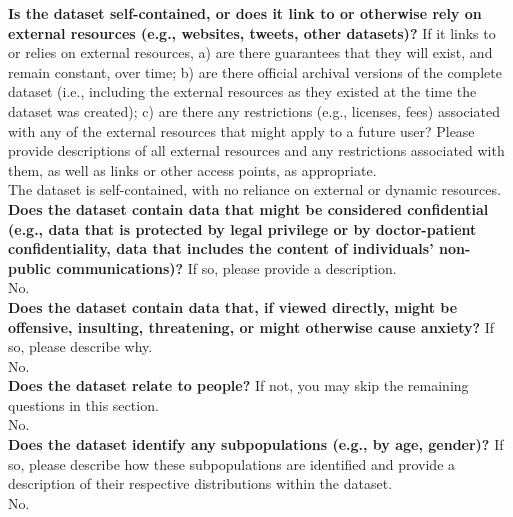     \textcolor{\sectioncolor}{\textbf{Is the dataset self-contained, or does it link to or otherwise rely on
    external resources (e.g., websites, tweets, other datasets)?
    }
    If it links to or relies on external resources, a) are there guarantees
    that they will exist, and remain constant, over time; b) are there official
    archival versions of the complete dataset (i.e., including the external
    resources as they existed at the time the dataset was created); c) are
    there any restrictions (e.g., licenses, fees) associated with any of the
    external resources that might apply to a future user? Please provide
    descriptions of all external resources and any restrictions associated with
    them, as well as links or other access points, as appropriate.
    } \\
    The dataset is self-contained, with no reliance on external or dynamic resources. \\
    
    \textcolor{\sectioncolor}{\textbf{Does the dataset contain data that might be considered confidential (e.g.,
    data that is protected by legal privilege or by doctor-patient
    confidentiality, data that includes the content of individuals’ non-public
    communications)?
    }
    If so, please provide a description.
    } \\
    No. \\
    
    \textcolor{\sectioncolor}{\textbf{Does the dataset contain data that, if viewed directly, might be offensive,
    insulting, threatening, or might otherwise cause anxiety?
    }
    If so, please describe why.
    } \\
    No. \\
    
    \textcolor{\sectioncolor}{\textbf{Does the dataset relate to people?
    }
    If not, you may skip the remaining questions in this section.
    } \\
    No. \\
    
    \textcolor{\sectioncolor}{\textbf{Does the dataset identify any subpopulations (e.g., by age, gender)?
    }
    If so, please describe how these subpopulations are identified and
    provide a description of their respective distributions within the dataset.
    } \\
    No. \\
    
